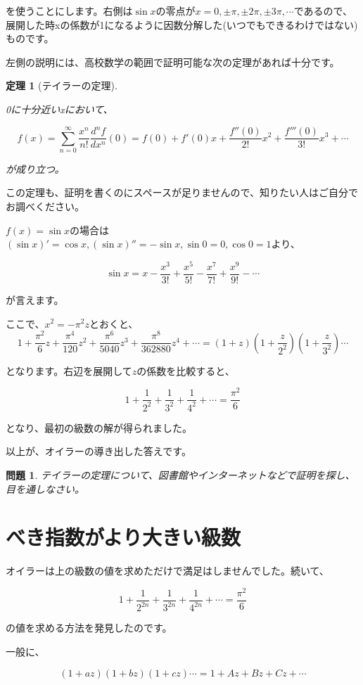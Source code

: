\documentclass[./main]{subfiles}
\theoremstyle{break}
\newtheorem*{thm}{定理}
\newtheorem*{prb}{問題}
\begin{document}
を使うことにします。右側は$\sin x$の零点が$x=0,\pm \pi,\pm 2\pi,\pm 3\pi,\cdots$であるので、展開した時xの係数が1になるように因数分解した(いつでもできるわけではない)ものです。

左側の説明には、高校数学の範囲で証明可能な次の定理があれば十分です。

\begin{thm}[テイラーの定理]
　

0に十分近いxにおいて、

\[f(x)=\sum_{n=0}^\infty \frac{x^n}{n!}\frac{d^nf}{dx^n}(0)=f(0)+f'(0)x+\frac{f''(0)}{2!}x^2+\frac{f'''(0)}{3!}x^3+\cdots\]

が成り立つ。
\end{thm}
この定理も、証明を書くのにスペースが足りませんので、知りたい人はご自分でお調べください。

$f(x)=\sin x$の場合は$(\sin x)'=\cos x,(\sin x)''=-\sin x,\sin 0=0,\cos 0=1$より、

\[\sin x=x-\frac{x^3}{3!}+\frac{x^5}{5!}-\frac{x^7}{7!}+\frac{x^9}{9!}-\cdots\]

が言えます。

ここで、$x^2=-\pi^2 z$とおくと、
\[1+\frac{\pi^2}{6}z+\frac{\pi^4}{120}z^2+\frac{\pi^6}{5040}z^3+\frac{\pi^8}{362880}z^4+\cdots=\left(  1+z\right)\left(  1+\frac{z}{2^2}\right)\left(  1+\frac{z}{3^2}\right)\cdots\]

となります。右辺を展開して$z$の係数を比較すると、

\[1+\frac{1}{2^2}+\frac{1}{3^2}+\frac{1}{4^2}+\cdots=\frac{\pi^2}{6}\]

となり、最初の級数の解が得られました。

以上が、オイラーの導き出した答えです。

\begin{prb}
テイラーの定理について、図書館やインターネットなどで証明を探し、目を通しなさい。
\end{prb}

\section{べき指数がより大きい級数}
オイラーは上の級数の値を求めただけで満足はしませんでした。続いて、

\[1+\frac{1}{2^{2n}}+\frac{1}{3^{2n}}+\frac{1}{4^{2n}}+\cdots=\frac{\pi^2}{6}\]

の値を求める方法を発見したのです。

一般に、

\[(1+az)(1+bz)(1+cz)\cdots=1+Az+Bz+Cz+\cdots\]
\end{document}
